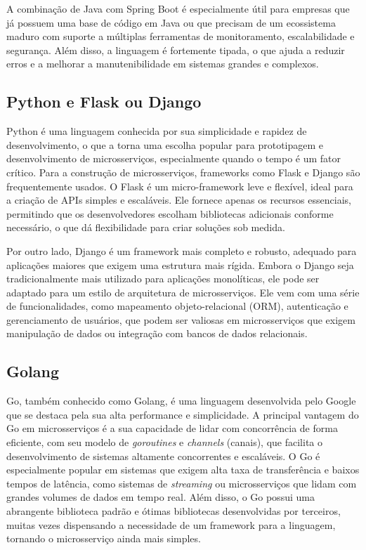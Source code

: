 A combinação de Java com Spring Boot é especialmente útil para empresas que já possuem uma base de código em Java ou que precisam de um ecossistema maduro com suporte a múltiplas ferramentas de monitoramento, escalabilidade e segurança. Além disso, a linguagem é fortemente tipada, o que ajuda a reduzir erros e a melhorar a manutenibilidade em sistemas grandes e complexos.

\subsection{Python e Flask ou Django}

Python é uma linguagem conhecida por sua simplicidade e rapidez de desenvolvimento, o que a torna uma escolha popular para prototipagem e desenvolvimento de microsserviços, especialmente quando o tempo é um fator crítico. Para a construção de microsserviços, frameworks como Flask e Django são frequentemente usados. O Flask é um micro-framework leve e flexível, ideal para a criação de APIs simples e escaláveis. Ele fornece apenas os recursos essenciais, permitindo que os desenvolvedores escolham bibliotecas adicionais conforme necessário, o que dá flexibilidade para criar soluções sob medida. 
\cite{flask}

Por outro lado, Django é um framework mais completo e robusto, adequado para aplicações maiores que exigem uma estrutura mais rígida. Embora o Django seja tradicionalmente mais utilizado para aplicações monolíticas, ele pode ser adaptado para um estilo de arquitetura de microsserviços. Ele vem com uma série de funcionalidades, como mapeamento objeto-relacional (ORM), autenticação e gerenciamento de usuários, que podem ser valiosas em microsserviços que exigem manipulação de dados ou integração com bancos de dados relacionais. 
\cite{django}

\subsection{Golang}

Go, também conhecido como Golang, é uma linguagem desenvolvida pelo Google que se destaca pela sua alta performance e simplicidade. A principal vantagem do Go em microsserviços é a sua capacidade de lidar com concorrência de forma eficiente, com seu modelo de \emph{goroutines} e \emph{channels} (canais), que facilita o desenvolvimento de sistemas altamente concorrentes e escaláveis. O Go é especialmente popular em sistemas que exigem alta taxa de transferência e baixos tempos de latência, como sistemas de \emph{streaming} ou microsserviços que lidam com grandes volumes de dados em tempo real. Além disso, o Go possui uma abrangente biblioteca padrão e ótimas bibliotecas desenvolvidas por terceiros, muitas vezes dispensando a necessidade de um framework para a linguagem, tornando o microsserviço ainda mais simples.
\cite{golang}

